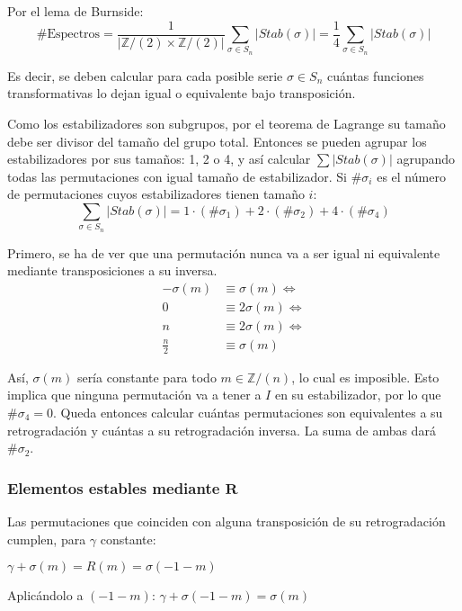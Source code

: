 		Por el lema de Burnside:
		\[\#\mbox{Espectros}=\frac{1}{|\mathbb{Z}/(2)\times\mathbb{Z}/(2)|}\sum_{\sigma\in{S}_n}|{Stab}(\sigma)|=\frac{1}{4}\sum_{\sigma\in{S}_n}|{Stab}(\sigma)|\]
		
		Es decir, se deben calcular para cada posible serie $\sigma\in{S}_n$ cu\'antas funciones transformativas lo dejan igual o equivalente bajo transposici\'on.
		
		Como los estabilizadores son subgrupos, por el teorema de Lagrange su tama\~no debe ser divisor del tama\~no del grupo total. Entonces se pueden agrupar los estabilizadores por sus tama\~nos: 1, 2 o 4, y as\'i calcular $\sum|{Stab}(\sigma)|$ agrupando todas las permutaciones con igual tama\~no de estabilizador. Si $\#\sigma_i$ es el n\'umero de permutaciones cuyos estabilizadores tienen tama\~no $i$:		
		\[\sum_{\sigma\in{S}_n}|{Stab}(\sigma)|=1\cdot(\#\sigma_1)+2\cdot(\#\sigma_2)+4\cdot(\#\sigma_4)\]
	
		Primero, se ha de ver que una permutaci\'on nunca va a ser igual ni equivalente mediante transposiciones a su inversa.\label{inversano}
			\begin{align*}
			-\sigma(m)&\equiv\sigma(m)\Longleftrightarrow\\
			0&\equiv2\sigma(m)\Longleftrightarrow\\
			n&\equiv2\sigma(m)\Longleftrightarrow\\
			\frac{n}{2}&\equiv\sigma(m)
			\end{align*}
		
		As\'i, $\sigma(m)$ ser\'ia constante para todo $m\in \mathbb{Z} / (n)$, lo cual es imposible. Esto implica que ninguna permutaci\'on va a tener a $I$ en su estabilizador, por lo que $\#\sigma_4=0$. Queda entonces calcular cu\'antas permutaciones son equivalentes a su retrogradaci\'on y cu\'antas a su retrogradaci\'on inversa. La suma de ambas dar\'a $\#\sigma_2$.
	
	\subsubsection[Elementos estables mediante $R$]{Elementos estables mediante $\bm{R}$}
		Las permutaciones que coinciden con alguna transposici\'on de su retrogradaci\'on cumplen, para $\gamma$ constante:
		
		\hspace*{8.5\bigskipamount} $\gamma+\sigma(m) = {R}(m) = \sigma(-1-m)$
		
		Aplic\'andolo a $(-1-m)$:
		$\gamma+\sigma(-1-m) = \sigma(m)$
		
